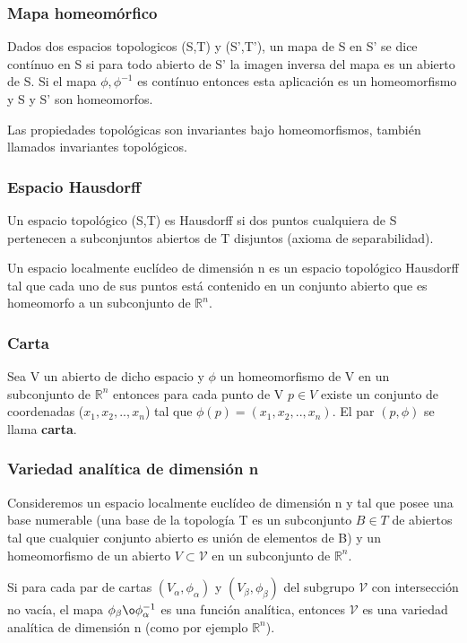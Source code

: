 \documentclass{article}
\begin{document}
 \subsubsection{Mapa homeomórfico}
 
 Dados dos espacios topologicos (S,T) y (S',T'), un mapa de S en S' se dice contínuo en S si para todo abierto de S' la imagen inversa del mapa es un abierto de S. Si el mapa $\phi , \phi ^{-1}$ es contínuo entonces esta aplicación es un homeomorfismo y S y S' son homeomorfos.
 
 \smallskip
 Las propiedades topológicas son invariantes bajo homeomorfismos, también llamados invariantes topológicos.
 
 \subsubsection{Espacio Hausdorff}
 
 Un espacio topológico (S,T) es Hausdorff si dos puntos cualquiera de S pertenecen a subconjuntos abiertos de T disjuntos (axioma de separabilidad).
 
 Un espacio localmente euclídeo de dimensión n es un espacio topológico Hausdorff tal que cada uno de sus puntos está contenido en un conjunto abierto que es homeomorfo a un subconjunto de $\mathds{R}^n$.
 
 
 \subsubsection{Carta}
 Sea V un abierto de dicho espacio y $\phi$ un homeomorfismo de V en un subconjunto de $\mathds{R}^n$ entonces para cada punto de V $p\in V$ existe un conjunto de coordenadas ($x_1,x_2,..,x_n$) tal que $\phi (p)= (x_1,x_2,..,x_n) $. El par $(p, \phi)$ se llama \textbf{carta}.
 
 \subsubsection{Variedad analítica de dimensión n}
 
 Consideremos un espacio localmente euclídeo de dimensión n y tal que posee una base numerable (una base de la topología T es un subconjunto $B \in T$ de abiertos tal que cualquier conjunto abierto es unión de elementos de B) y un homeomorfismo de un abierto $V \subset \mathcal{V}$ en un subconjunto de $\mathds{R}^n$.
 
 \smallskip
 Si para cada par de cartas $(V_\alpha , \phi _\alpha)$ y $(V_\beta , \phi _\beta)$ del subgrupo $\mathcal{V}$ con intersección no vacía, el mapa $\phi _\beta \o \phi _\alpha ^{-1}$ es una función analítica, entonces $\mathcal{V}$ es una variedad analítica de dimensión n (como por ejemplo $\mathds{R}^n$).
 
\end{document}
